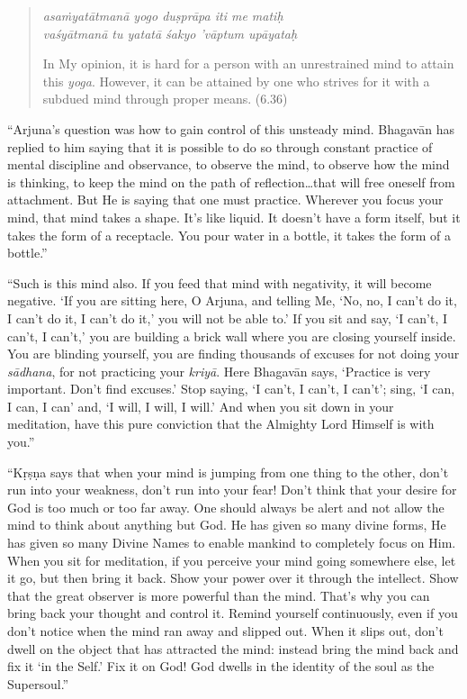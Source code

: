 \documentclass[12pt, twoside, openright]{memoir}
\begin{document}
\par
\begin{verse}
\textit{asaṁyatātmanā yogo duṣprāpa iti me matiḥ} \\
\textit{vaśyātmanā tu yatatā śakyo ’vāptum upāyataḥ}

\noindent In My opinion, it is hard for a person with an unrestrained mind to attain this \textit{yoga}. However, it can be attained by one who strives for it with a subdued mind through proper means. (6.36)
\end{verse}
\par


\enquote{Arjuna’s question was how to gain control of this unsteady mind. Bhagavān has replied to him saying that it is possible to do so through constant practice of mental discipline and observance, to observe the mind, to observe how the mind is thinking, to keep the mind on the path of reflection\ldots that will free oneself from attachment. But He is saying that one must practice. Wherever you focus your mind, that mind takes a shape. It’s like liquid. It doesn’t have a form itself, but it takes the form of a receptacle. You pour water in a bottle, it takes the form of a bottle.}

\enquote{Such is this mind also. If you feed that mind with negativity, it will become negative. \enquote{If you are sitting here, O Arjuna, and telling Me, ‘No, no, I can’t do it, I can’t do it, I can’t do it,’ you will not be able to.} If you sit and say, \enquote{I can’t, I can’t, I can’t,} you are building a brick wall where you are closing yourself inside. You are blinding yourself, you are finding thousands of excuses for not doing your \textit{sādhana}, for not practicing your \textit{kriyā}. Here Bhagavān says, \enquote{Practice is very important. Don’t find excuses.} Stop saying, \enquote{I can’t, I can’t, I can’t}; sing, \enquote{I can, I can, I can} and, \enquote{I will, I will, I will.} And when you sit down in your meditation, have this pure conviction that the Almighty Lord Himself is with you.}

\enquote{Kṛṣṇa says that when your mind is jumping from one thing to the other, don’t run into your weakness, don’t run into your fear! Don’t think that your desire for God is too much or too far away. One should always be alert and not allow the mind to think about anything but God. He has given so many divine forms, He has given so many Divine Names to enable mankind to completely focus on Him. When you sit for meditation, if you perceive your mind going somewhere else, let it go, but then bring it back. Show your power over it through the intellect. Show that the great observer is more powerful than the mind. That’s why you can bring back your thought and control it. Remind yourself continuously, even if you don’t notice when the mind ran away and slipped out. When it slips out, don’t dwell on the object that has attracted the mind: instead bring the mind back and fix it \enquote{in the Self.} Fix it on God! God dwells in the identity of the soul as the Supersoul.}
\end{document}
